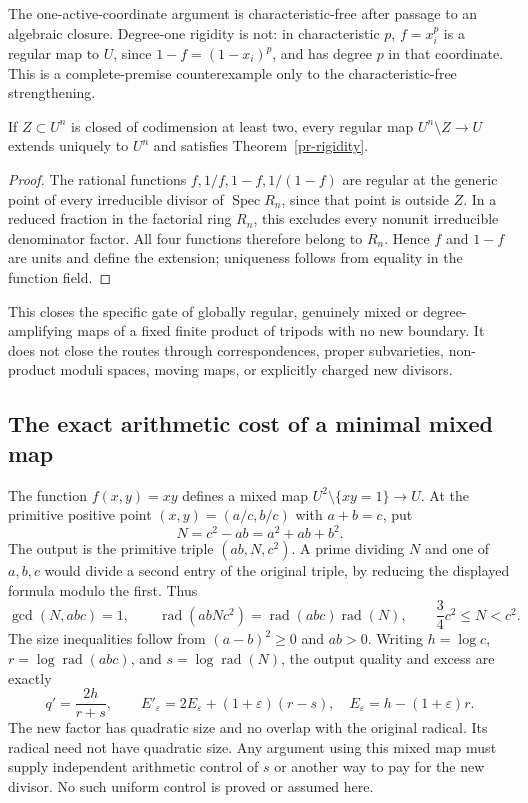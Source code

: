 The one-active-coordinate argument is characteristic-free after passage to
an algebraic closure. Degree-one rigidity is not: in characteristic $p$,
$f=x_i^p$ is a regular map to $U$, since $1-f=(1-x_i)^p$, and has degree
$p$ in that coordinate. This is a complete-premise counterexample only to
the characteristic-free strengthening.

\begin{corollary}
\label{pr-codimension-two}
If $Z\subset U^n$ is closed of codimension at least two, every regular map
$U^n\setminus Z\to U$ extends uniquely to $U^n$ and satisfies
Theorem~\ref{pr-rigidity}.
\end{corollary}
\begin{proof}
The rational functions $f,1/f,1-f,1/(1-f)$ are regular at the generic point
of every irreducible divisor of $\operatorname{Spec}R_n$, since that point
is outside $Z$. In a reduced fraction in the factorial ring $R_n$, this
excludes every nonunit irreducible denominator factor. All four functions
therefore belong to $R_n$. Hence $f$ and $1-f$ are units and define the
extension; uniqueness follows from equality in the function field.
\end{proof}

This closes the specific gate of globally regular, genuinely mixed or
degree-amplifying maps of a fixed finite product of tripods with no new
boundary. It does not close the routes through correspondences, proper
subvarieties, non-product moduli spaces, moving maps, or explicitly charged
new divisors.

\subsection{The exact arithmetic cost of a minimal mixed map}
The function $f(x,y)=xy$ defines a mixed map
$U^2\setminus\{xy=1\}\to U$. At the primitive positive point
$(x,y)=(a/c,b/c)$ with $a+b=c$, put
\[
 N=c^2-ab=a^2+ab+b^2.
\]
The output is the primitive triple $(ab,N,c^2)$. A prime dividing $N$
and one of $a,b,c$ would divide a second entry of the original triple,
by reducing the displayed formula modulo the first. Thus
\[
 \gcd(N,abc)=1,\qquad
 \operatorname{rad}(abNc^2)=\operatorname{rad}(abc)\operatorname{rad}(N),
 \qquad \frac34c^2\le N<c^2.
\]
The size inequalities follow from $(a-b)^2\ge0$ and $ab>0$.
Writing $h=\log c$, $r=\log\operatorname{rad}(abc)$, and
$s=\log\operatorname{rad}(N)$, the output quality and excess are exactly
\[
 q'=\frac{2h}{r+s},\qquad
 E'_\varepsilon
 =2E_\varepsilon+(1+\varepsilon)(r-s),
 \quad E_\varepsilon=h-(1+\varepsilon)r.
\]
The new factor has quadratic size and no overlap with the original radical.
Its radical need not have quadratic size. Any argument using this mixed map
must supply independent arithmetic control of $s$ or another way to pay for
the new divisor. No such uniform control is proved or assumed here.

